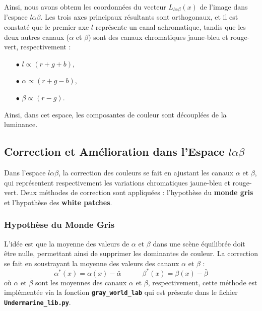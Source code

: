 \documentclass[10pt, a4paper]{extarticle}
\numberwithin{equation}{section}
\numberwithin{figure}{section}
\begin{document}
\vspace{3mm}
\par Ainsi, nous avons obtenu les coordonnées du vecteur \( L_{l\alpha\beta}(x) \) de l'image dans l'espace \( l\alpha\beta \). Les trois axes principaux résultants sont orthogonaux, et il est constaté que le premier axe \( l \) représente un canal achromatique, tandis que les deux autres canaux (\( \alpha \) et \( \beta \)) sont des canaux chromatiques jaune-bleu et rouge-vert, respectivement :

\begin{itemize}
    \item[$\bullet$] \( l \propto (r + g + b) \),
    \item[$\bullet$] \( \alpha \propto (r + g - b) \),
    \item[$\bullet$] \( \beta \propto(r - g) \).
\end{itemize}
Ainsi, dans cet espace, les composantes de couleur sont découplées de la luminance.


\subsection{Correction et Amélioration dans l'Espace \( l\alpha\beta \)}

Dans l'espace \( l\alpha\beta \), la correction des couleurs se fait en ajustant les canaux \( \alpha \) et \( \beta \), qui représentent respectivement les variations chromatiques jaune-bleu et rouge-vert. Deux méthodes de correction sont appliquées : l'hypothèse du \textbf{monde gris} et l'hypothèse des \textbf{white patches}.

\subsubsection{Hypothèse du Monde Gris}  
   L'idée est que la moyenne des valeurs de \( \alpha \) et \( \beta \) dans une scène équilibrée doit être nulle, permettant ainsi de supprimer les dominantes de couleur. La correction se fait en soustrayant la moyenne des valeurs des canaux \( \alpha \) et \( \beta \) :
   \[
   \alpha^*(x) = \alpha(x) - \bar{\alpha} \quad\quad\quad \beta^*(x) = \beta(x) - \bar{\beta}
   \]
   où \( \bar{\alpha} \) et \( \bar{\beta} \) sont les moyennes des canaux \( \alpha \) et \( \beta \), respectivement, cette méthode est implémentée via la fonction \colorbox{gray!15}{\texttt{\textbf{gray\_world\_lab}}} qui est présente dans le fichier \colorbox{gray!15}{\texttt{\textbf{Undermarine\_lib.py}}}.
\end{document}
